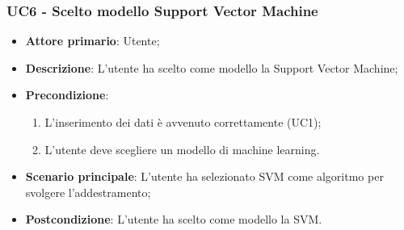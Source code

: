 \subsubsection{UC6 - Scelto modello Support Vector Machine}%
\label{sssec:uc6}
\begin{itemize}
  \item \textbf{Attore primario}: Utente;
  \item \textbf{Descrizione}: L'utente ha scelto come modello la Support Vector Machine;
  \item \textbf{Precondizione}:
  \begin{enumerate}
    \item L'inserimento dei dati è avvenuto correttamente (UC1);
    \item L'utente deve scegliere un modello di machine learning.
  \end{enumerate}
  \item \textbf{Scenario principale}: L'utente ha selezionato SVM come algoritmo per svolgere l'addestramento;
  \item \textbf{Postcondizione}: L'utente ha scelto come modello la SVM.
\end{itemize}
